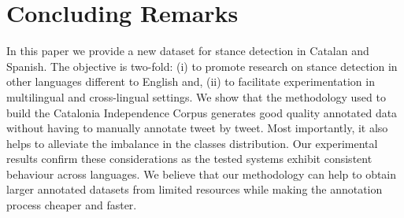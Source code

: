 \documentclass[10pt, a4paper]{article}
\begin{document}






\section{Concluding Remarks}\label{sec:concluding-remarks}

In this paper we provide a new dataset for stance detection in Catalan and Spanish. The objective is two-fold: (i) to promote research on stance detection in other languages different to English and, (ii) to facilitate experimentation in multilingual and cross-lingual settings. We show that the methodology used to build the Catalonia Independence Corpus generates good quality annotated data without having to manually annotate tweet by tweet. Most importantly, it also helps to alleviate the imbalance in the classes distribution. Our experimental results confirm these considerations as the tested systems exhibit consistent behaviour across languages. We believe that our methodology can help to obtain larger annotated datasets from limited resources while making the annotation process cheaper and faster.
\end{document}
